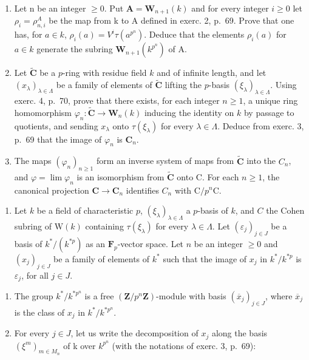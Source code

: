 \begin{enumerate}
\def\labelenumi{\alph{enumi})}
\item
  Let n be an integer \(\geqslant 0\). Put \(\mathbf{A} = \mathbf{W}_{n+1}(k)\) and for every integer \(i \geqslant 0\) let \(\rho_{i} = \rho_{n,i}^{A}\) be the map from k to A defined in exerc. 2, p.~69. Prove that one has, for \(a \in k\), \(\rho_{i}(a) = V^{i}\tau(a^{p^{n}})\). Deduce that the elements \(\rho_{i}(a)\) for \(a \in k\) generate the subring \(\mathbf{W}_{n+1}(k^{p^{n}})\) of A.
\item
  Let \(\tilde{\mathbf{C}}\) be a \(p\)-ring with residue field \(k\) and of infinite length, and let \((x_{\lambda})_{\lambda \in \Lambda}\) be a family of elements of \(\tilde{\mathbf{C}}\) lifting the \(p\)-basis \((\xi_{\lambda})_{\lambda \in \Lambda}\). Using exerc. 4, p.~70, prove that there exists, for each integer \(n \geqslant 1\), a unique ring homomorphism \(\varphi_n: \tilde{\mathbf{C}} \to \mathbf{W}_n(k)\) inducing the identity on \(k\) by passage to quotients, and sending \(x_{\lambda}\) onto \(\tau(\xi_{\lambda})\) for every \(\lambda \in \Lambda\). Deduce from exerc. 3, p.~69 that the image of \(\varphi_n\) is \(\mathbf{C}_n\).
\item
  The maps \((\varphi_n)_{n\geqslant 1}\) form an inverse system of maps from \(\tilde{\mathbf{C}}\) into the \(C_n\), and \(\varphi = \lim \varphi_n\) is an isomorphism from \(\tilde{\mathbf{C}}\) onto C. For each \(n\geqslant 1\), the canonical projection \(\mathbf{C}\to \mathbf{C}_n\) identifies \(C_n\) with \(\mathrm{C} / p^n\mathrm{C}\).
\end{enumerate}

\begin{enumerate}
\def\labelenumi{\arabic{enumi})}
\setcounter{enumi}{10}
\tightlist
\item
  Let \(k\) be a field of characteristic \(p\), \((\xi_{\lambda})_{\lambda \in \Lambda}\) a \(p\)-basis of \(k\), and \(C\) the Cohen subring of \(\mathrm{W}(k)\) containing \(\tau(\xi_{\lambda})\) for every \(\lambda \in \Lambda\). Let \((\varepsilon_j)_{j \in J}\) be a basis of \(k^*/(k^{*p})\) as an \(\mathbf{F}_p\)-vector space. Let \(n\) be an integer \(\geqslant 0\) and \((x_j)_{j \in J}\) be a family of elements of \(k^*\) such that the image of \(x_j\) in \(k^*/k^{*p}\) is \(\varepsilon_j\), for all \(j \in J\).
\end{enumerate}

\begin{enumerate}
\def\labelenumi{\alph{enumi})}
\item
  The group \(k^{*} / k^{*p^{n}}\) is a free \((\mathbf{Z} / p^{n}\mathbf{Z})\)-module with basis \((\overline{x}_j)_{j\in J}\), where \(\overline{x}_j\) is the class of \(x_j\) in \(k^{*} / k^{*p^{n}}\).
\item
  For every \(j \in J\), let us write the decomposition of \(x_{j}\) along the basis \((\xi^{m})_{m \in M_{n}}\) of k over \(k^{p^{n}}\) (with the notations of exerc. 3, p.~69):
\end{enumerate}

